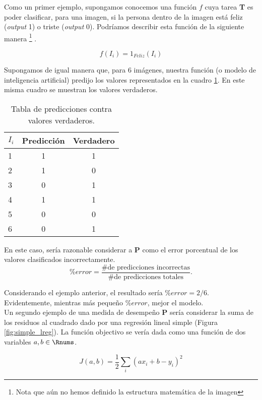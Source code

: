 \documentclass[11pt]{article}
\begin{document}
Como un primer ejemplo, supongamos conocemos una función $f$ cuya tarea \textbf{T} es poder clasificar, para una imagen, si la persona dentro de la imagen está feliz (\textit{output} 1) o triste (\textit{output} 0). Podríamos describir esta función de la siguiente manera \footnote{Nota que aún no hemos definido la estructura matemática de la imagen} .

\begin{equation}
	f(I_i) = 1_{Feliz}(I_i)
\end{equation}

Supongamos de igual manera que, para 6 imágenes, nuestra función (o modelo de inteligencia artificial) predijo los valores representados en la cuadro \ref{table:classtable}. En este misma cuadro se muestran los valores verdaderos.

\begin{table}[h!]
\centering
\begin{tabular}{l|cc}
  $I_i$ & Predicción & Verdadero \\
  \hline
  1& 1& 1\\
  2& 1& 0\\
  3& 0& 1\\
  4& 1& 1\\
  5& 0& 0\\
  6& 0& 1
\end{tabular}
\caption{Tabla de predicciones contra valores verdaderos.}
\label{table:classtable}
\end{table}

En este caso, sería razonable considerar a \textbf{P} como el error porcentual de los valores clasificados incorrectamente.
\begin{equation}
	\%error = \frac{\# \mbox{de predicciones incorrectas}}{\# \mbox{de predicciones totales}}.
\end{equation}

Considerando el ejemplo anterior, el resultado sería $\%error = 2/6$. Evidentemente, mientras más pequeño $\%error$, mejor el modelo.\\

Un segundo ejemplo de una medida de desempeño \textbf{P} sería considerar la suma de los residuos al cuadrado dado por una regresión lineal simple (Figura \ref{fig:simple_lreg}). La función objectivo se vería dada como una función de dos variables $a, b \in \Rnums$.

\begin{equation} \label{eq:simple_lreg}
	J(a, b) = \frac{1}{2}\sum_i(ax_i + b - y_i)^2
\end{equation}
\end{document}
